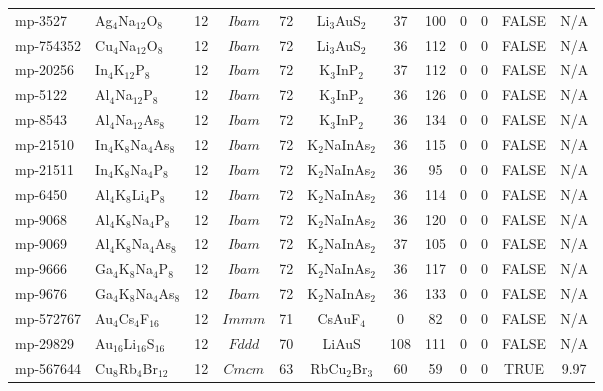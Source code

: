 {\begin{longtable}{llcccccccccc}
    mp-3527 & Ag$_{4}$Na$_{12}$O$_{8}$ & 12    & $Ibam$ & 72    & Li$_{3}$AuS$_{2}$ & 37    & 100   & 0     & 0     & FALSE & N/A \\
    mp-754352 & Cu$_{4}$Na$_{12}$O$_{8}$ & 12    & $Ibam$ & 72    & Li$_{3}$AuS$_{2}$ & 36    & 112   & 0     & 0     & FALSE & N/A \\
    mp-20256 & In$_{4}$K$_{12}$P$_{8}$ & 12    & $Ibam$ & 72    & K$_{3}$InP$_{2}$ & 37    & 112   & 0     & 0     & FALSE & N/A \\
    mp-5122 & Al$_{4}$Na$_{12}$P$_{8}$ & 12    & $Ibam$ & 72    & K$_{3}$InP$_{2}$ & 36    & 126   & 0     & 0     & FALSE & N/A \\
    mp-8543 & Al$_{4}$Na$_{12}$As$_{8}$ & 12    & $Ibam$ & 72    & K$_{3}$InP$_{2}$ & 36    & 134   & 0     & 0     & FALSE & N/A \\
    mp-21510 & In$_{4}$K$_{8}$Na$_{4}$As$_{8}$ & 12    & $Ibam$ & 72    & K$_{2}$NaInAs$_{2}$ & 36    & 115   & 0     & 0     & FALSE & N/A \\
    mp-21511 & In$_{4}$K$_{8}$Na$_{4}$P$_{8}$ & 12    & $Ibam$ & 72    & K$_{2}$NaInAs$_{2}$ & 36    & 95    & 0     & 0     & FALSE & N/A \\
    mp-6450 & Al$_{4}$K$_{8}$Li$_{4}$P$_{8}$ & 12    & $Ibam$ & 72    & K$_{2}$NaInAs$_{2}$ & 36    & 114   & 0     & 0     & FALSE & N/A \\
    mp-9068 & Al$_{4}$K$_{8}$Na$_{4}$P$_{8}$ & 12    & $Ibam$ & 72    & K$_{2}$NaInAs$_{2}$ & 36    & 120   & 0     & 0     & FALSE & N/A \\
    mp-9069 & Al$_{4}$K$_{8}$Na$_{4}$As$_{8}$ & 12    & $Ibam$ & 72    & K$_{2}$NaInAs$_{2}$ & 37    & 105   & 0     & 0     & FALSE & N/A \\
    mp-9666 & Ga$_{4}$K$_{8}$Na$_{4}$P$_{8}$ & 12    & $Ibam$ & 72    & K$_{2}$NaInAs$_{2}$ & 36    & 117   & 0     & 0     & FALSE & N/A \\
    mp-9676 & Ga$_{4}$K$_{8}$Na$_{4}$As$_{8}$ & 12    & $Ibam$ & 72    & K$_{2}$NaInAs$_{2}$ & 36    & 133   & 0     & 0     & FALSE & N/A \\
    mp-572767 & Au$_{4}$Cs$_{4}$F$_{16}$ & 12    & $Immm$ & 71    & CsAuF$_{4}$ & 0     & 82    & 0     & 0     & FALSE & N/A \\
    mp-29829 & Au$_{16}$Li$_{16}$S$_{16}$ & 12    & $Fddd$ & 70    & LiAuS & 108   & 111   & 0     & 0     & FALSE & N/A \\
    mp-567644 & Cu$_{8}$Rb$_{4}$Br$_{12}$ & 12    & $Cmcm$ & 63    & RbCu$_{2}$Br$_{3}$ & 60    & 59    & 0     & 0     & TRUE  & 9.97  \\

\end{longtable}}
